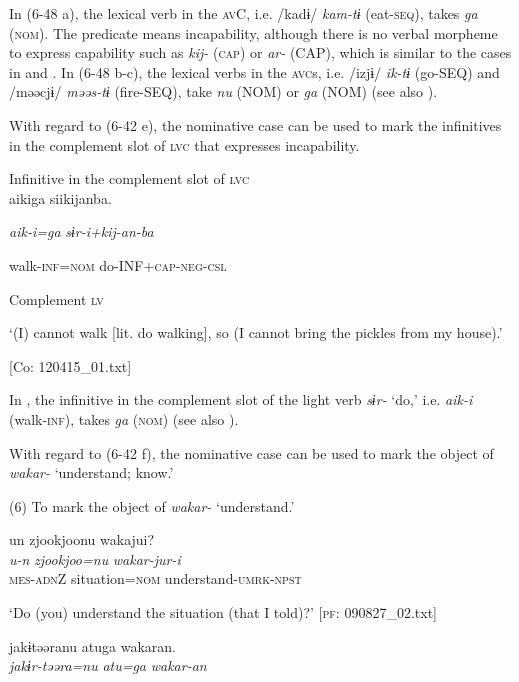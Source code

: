 In (6-48 a), the lexical verb in the \textsc{av}C, i.e. /kadɨ/ \textit{kam-tɨ} (eat-\textsc{seq}), takes \textit{ga} (\textsc{nom}). The predicate means incapability, although there is no verbal morpheme to express capability such as \textit{kij-} (\textsc{cap}) or \textit{ar-} (CAP), which is similar to the cases in  and . In (6-48 b-c), the lexical verbs in the \textsc{avc}s, i.e. /izjɨ/ \textit{ik-tɨ} (go-SEQ) and /məəcjɨ/ \textit{məəs-tɨ} (fire-SEQ), take \textit{nu} (NOM) or \textit{ga} (NOM) (see also ).

With regard to (6-42 e), the nominative case can be used to mark the infinitives in the complement slot of \textsc{lvc} that expresses incapability.

\ea\label{ex:6-49}
 Infinitive in the complement slot of \textsc{lvc}\\

{\TM}
\gll aikiga  siikijanba.

    \textit{aik-i=ga}  \textit{sɨr-i+kij-an-ba}

    walk-\textsc{inf}=\textsc{nom}  do-INF+\textsc{cap}-\textsc{neg}-\textsc{csl}

    Complement  \textsc{lv}

\glt    ‘(I) cannot walk [lit. do walking], so (I cannot bring the pickles from my house).’

  [Co: 120415\_01.txt]
\z

In , the infinitive in the complement slot of the light verb \textit{sɨr-} ‘do,’ i.e. \textit{aik-i} (walk-\textsc{inf}), takes \textit{ga} (\textsc{nom}) (see also ).

  With regard to (6-42 f), the nominative case can be used to mark the object of \textit{wakar-} ‘understand; know.’

(6)  To mark the object of \textit{wakar-} ‘understand.’

 \ea {\TM}  un  {\textbar}zjookjoo{\textbar}nu  wakajui?\\
\gll \textit{u-n}  \textit{zjookjoo=nu}  \textit{wakar-jur-i}\\

      \textsc{mes}-\textsc{adn}Z  situation=\textsc{nom}  understand-\textsc{umrk}-\textsc{npst}

\glt ‘Do (you) understand the situation (that I told)?’ [\textsc{pf}: 090827\_02.txt]
\z

 \ex {\TM}  jakɨtəəranu  atuga  wakaran.\\
\gll \textit{jakɨr-təəra=nu}  \textit{atu=ga}  \textit{wakar-an}\\

